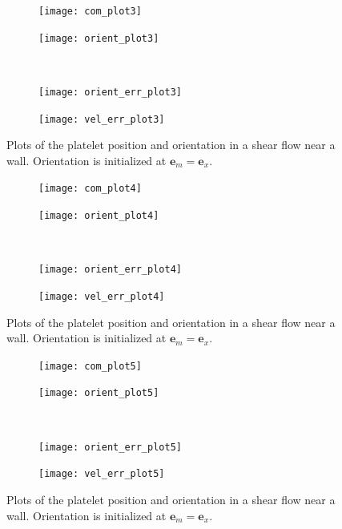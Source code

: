 \documentclass{article}
\newcommand{\vect}[1]{\boldsymbol{\mathbf{#1}}}
\begin{document}
\begin{figure}
  \centering
  \begin{subfigure}{0.49\textwidth}
    \texttt{[image: com\_plot3]}
  \end{subfigure}
  \hfill
  \begin{subfigure}{0.49\textwidth}
    \texttt{[image: orient\_plot3]}
  \end{subfigure}
  \\
  \begin{subfigure}{0.49\textwidth}
    \texttt{[image: orient\_err\_plot3]}
  \end{subfigure}
  \hfill
  \begin{subfigure}{0.49\textwidth}
    \texttt{[image: vel\_err\_plot3]}
  \end{subfigure}
  \caption{Plots of the platelet position and orientation in a shear
    flow near a wall. Orientation is initialized at $\vect{e}_m =
    \vect{e}_x$.} 
  \label{fig:com_plot3}
\end{figure}

\begin{figure}
  \centering
  \begin{subfigure}{0.49\textwidth}
    \texttt{[image: com\_plot4]}
  \end{subfigure}
  \hfill
  \begin{subfigure}{0.49\textwidth}
    \texttt{[image: orient\_plot4]}
  \end{subfigure}
  \\
  \begin{subfigure}{0.49\textwidth}
    \texttt{[image: orient\_err\_plot4]}
  \end{subfigure}
  \hfill
  \begin{subfigure}{0.49\textwidth}
    \texttt{[image: vel\_err\_plot4]}
  \end{subfigure}
  \caption{Plots of the platelet position and orientation in a shear
    flow near a wall. Orientation is initialized at $\vect{e}_m =
    \vect{e}_x$.} 
  \label{fig:com_plot4}
\end{figure}

\begin{figure}
  \centering
  \begin{subfigure}{0.49\textwidth}
    \texttt{[image: com\_plot5]}
  \end{subfigure}
  \hfill
  \begin{subfigure}{0.49\textwidth}
    \texttt{[image: orient\_plot5]}
  \end{subfigure}
  \\
  \begin{subfigure}{0.49\textwidth}
    \texttt{[image: orient\_err\_plot5]}
  \end{subfigure}
  \hfill
  \begin{subfigure}{0.49\textwidth}
    \texttt{[image: vel\_err\_plot5]}
  \end{subfigure}
  \caption{Plots of the platelet position and orientation in a shear
    flow near a wall. Orientation is initialized at $\vect{e}_m =
    \vect{e}_x$.} 
  \label{fig:com_plot5}
\end{figure}
\end{document}
